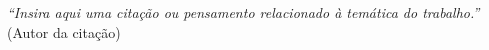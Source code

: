 \begin{epigrafe}
  \vspace*{\fill}
  \begin{flushright}
    \textit{``Insira aqui uma citação ou pensamento relacionado à temática do trabalho.''}\\
    (Autor da citação)
  \end{flushright}
\end{epigrafe}
